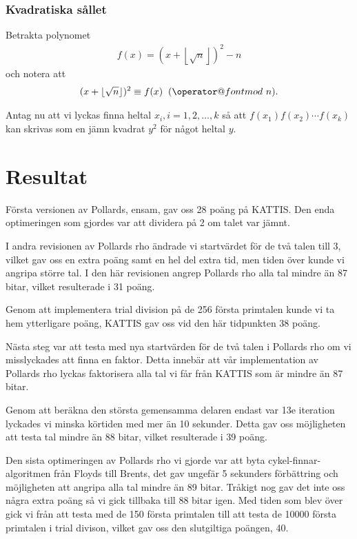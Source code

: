 \documentclass[a4paper,12pt]{article}
\makeatletter
\def\imod#1{\allowbreak\mkern10mu({\operator@font mod}\,\,#1)}
\renewcommand{\*}{\ensuremath{\cdot}}
\makeatother
\begin{document}
\subsubsection{Kvadratiska sållet}

Betrakta polynomet 
\begin{align*}
    f(x) = (x + \left\lfloor \sqrt{n} \right\rfloor)^2 - n
\end{align*}
och notera att
\begin{align*}
    (x + \lfloor \sqrt{n} \rfloor)^2 \equiv f(x) \imod{n}.
\end{align*}

Antag nu att vi lyckas finna heltal $x_i, i = 1, 2, \dots, k$ så att
$f(x_1)f(x_2)\cdots f(x_k)$ kan skrivas som en jämn kvadrat $y^2$ för något
heltal $y$.






\section{Resultat}

Första versionen av Pollards, ensam, gav oss 28 poäng på KATTIS. Den enda optimeringen som gjordes var att dividera på 2 om talet var jämnt.

I andra revisionen av Pollards rho ändrade vi startvärdet för de två talen till 3, vilket gav oss en extra poäng samt en hel del extra tid, men tiden över kunde vi angripa större tal. I den här revisionen angrep Pollards rho alla tal mindre än 87 bitar, vilket resulterade i 31 poäng.

Genom att implementera trial division på de 256 första primtalen kunde vi ta hem ytterligare poäng, KATTIS gav oss vid den här tidpunkten 38 poäng.

Nästa steg var att testa med nya startvärden för de två talen i Pollards rho om vi misslyckades att finna en faktor. Detta innebär att vår implementation av Pollards rho lyckas faktorisera alla tal vi får från KATTIS som är mindre än 87 bitar.

Genom att beräkna den största gemensamma delaren endast var 13e iteration lyckades vi minska körtiden med mer än 10 sekunder. Detta gav oss möjligheten att testa tal mindre än 88 bitar, vilket resulterade i 39 poäng.

Den sista optimeringen av Pollards rho vi gjorde var att byta cykel-finnar-algoritmen från Floyds till Brents, det gav ungefär 5 sekunders förbättring och möjligheten att angripa alla tal mindre än 89 bitar. Tråkigt nog gav det inte oss några extra poäng så vi gick tillbaka till 88 bitar igen. Med tiden som blev över gick vi från att testa med de 150 första primtalen till att testa de 10000 första primtalen i trial divison, vilket gav oss den slutgiltiga poängen, 40.
\end{document}
